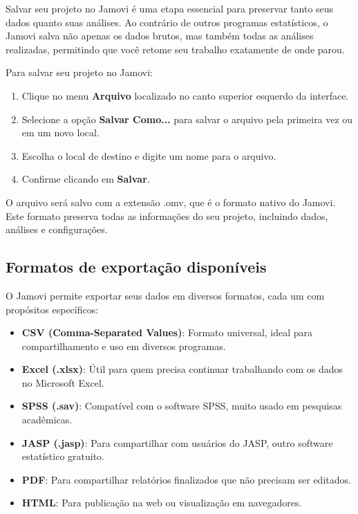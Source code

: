Salvar seu projeto no Jamovi é uma etapa essencial para preservar tanto seus dados quanto suas análises. Ao contrário de outros programas estatísticos, o Jamovi salva não apenas os dados brutos, mas também todas as análises realizadas, permitindo que você retome seu trabalho exatamente de onde parou.

Para salvar seu projeto no Jamovi:

\begin{enumerate}
    \item Clique no menu \textbf{Arquivo} localizado no canto superior esquerdo da interface.
    \item Selecione a opção \textbf{Salvar Como...} para salvar o arquivo pela primeira vez ou em um novo local.
    \item Escolha o local de destino e digite um nome para o arquivo.
    \item Confirme clicando em \textbf{Salvar}.
\end{enumerate}

O arquivo será salvo com a extensão .omv, que é o formato nativo do Jamovi. Este formato preserva todas as informações do seu projeto, incluindo dados, análises e configurações.

\subsection{Formatos de exportação disponíveis}

O Jamovi permite exportar seus dados em diversos formatos, cada um com propósitos específicos:

\begin{itemize}
    \item \textbf{CSV (Comma-Separated Values)}: Formato universal, ideal para compartilhamento e uso em diversos programas.
    \item \textbf{Excel (.xlsx)}: Útil para quem precisa continuar trabalhando com os dados no Microsoft Excel.
    \item \textbf{SPSS (.sav)}: Compatível com o software SPSS, muito usado em pesquisas acadêmicas.
    \item \textbf{JASP (.jasp)}: Para compartilhar com usuários do JASP, outro software estatístico gratuito.
    \item \textbf{PDF}: Para compartilhar relatórios finalizados que não precisam ser editados.
    \item \textbf{HTML}: Para publicação na web ou visualização em navegadores.
\end{itemize}


